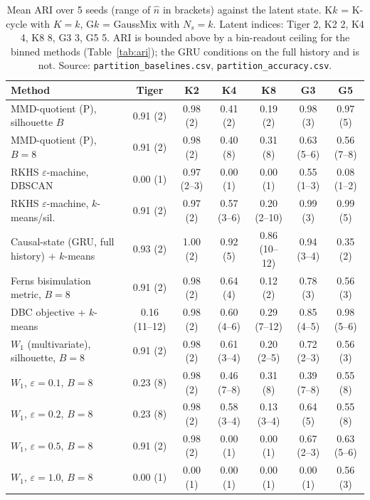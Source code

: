 \documentclass[10pt]{article}
\begin{document}
\begin{table}[t]
\centering
\scriptsize
\caption{Mean ARI over 5 seeds (range of $\hat n$ in brackets) against the
  latent state.  K$k$ = K-cycle with $K=k$, G$k$ = GaussMix with $N_s=k$.
  Latent indices: Tiger 2, K2 2, K4 4, K8 8, G3 3, G5 5.  ARI is bounded
  above by a bin-readout ceiling for the binned methods (Table~\ref{tab:ari});
  the GRU conditions on the full history and is not.  Source:
  \texttt{partition\_baselines.csv}, \texttt{partition\_accuracy.csv}.}
\label{tab:baselines}
\begin{tabular}{lcccccc}
\toprule
Method & Tiger & K2 & K4 & K8 & G3 & G5 \\
\midrule
MMD-quotient (P), silhouette $B$ & 0.91 (2) & 0.98 (2) & 0.41 (2) & 0.19 (2) & 0.98 (3) & 0.97 (5) \\
MMD-quotient (P), $B=8$ & 0.91 (2) & 0.98 (2) & 0.40 (8) & 0.31 (8) & 0.63 (5--6) & 0.56 (7--8) \\
RKHS $\varepsilon$-machine, DBSCAN & 0.00 (1) & 0.97 (2--3) & 0.00 (1) & 0.00 (1) & 0.55 (1--3) & 0.08 (1--2) \\
RKHS $\varepsilon$-machine, $k$-means/sil. & 0.91 (2) & 0.97 (2) & 0.57 (3--6) & 0.20 (2--10) & 0.99 (3) & 0.99 (5) \\
Causal-state (GRU, full history) + $k$-means & 0.93 (2) & 1.00 (2) & 0.92 (5) & 0.86 (10--12) & 0.94 (3--4) & 0.35 (2) \\
Ferns bisimulation metric, $B=8$ & 0.91 (2) & 0.98 (2) & 0.64 (4) & 0.12 (2) & 0.78 (3) & 0.56 (3) \\
DBC objective + $k$-means & 0.16 (11--12) & 0.98 (2) & 0.60 (4--6) & 0.29 (7--12) & 0.85 (4--5) & 0.98 (5--6) \\
$W_1$ (multivariate), silhouette, $B=8$ & 0.91 (2) & 0.98 (2) & 0.61 (3--4) & 0.20 (2--5) & 0.72 (2--3) & 0.56 (3) \\
$W_1$, $\varepsilon=0.1$, $B=8$ & 0.23 (8) & 0.98 (2) & 0.46 (7--8) & 0.31 (8) & 0.39 (7--8) & 0.55 (8) \\
$W_1$, $\varepsilon=0.2$, $B=8$ & 0.23 (8) & 0.98 (2) & 0.58 (3--4) & 0.13 (3--4) & 0.64 (5) & 0.55 (8) \\
$W_1$, $\varepsilon=0.5$, $B=8$ & 0.91 (2) & 0.98 (2) & 0.00 (1) & 0.00 (1) & 0.67 (2--3) & 0.63 (5--6) \\
$W_1$, $\varepsilon=1.0$, $B=8$ & 0.00 (1) & 0.00 (1) & 0.00 (1) & 0.00 (1) & 0.00 (1) & 0.56 (3) \\
\bottomrule
\end{tabular}
\end{table}
\end{document}
